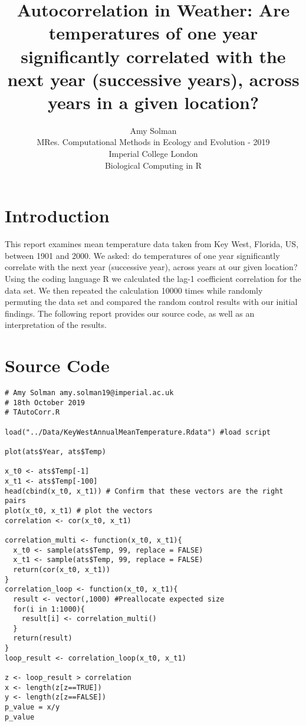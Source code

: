\documentclass[final,3p]{CSP}
\begin{document}
\begin{frontmatter}

\title{Autocorrelation in Weather: Are temperatures of one year significantly correlated with the next year (successive years), across years in a given location?}

\author{Amy Solman \\%
MRes. Computational Methods in Ecology and Evolution - 2019\\
Imperial College London\\
Biological Computing in R}


\end{frontmatter}

\section{Introduction}
\label{}
\noindent
This report examines mean temperature data taken from Key West, Florida, US, between 1901 and 2000. We asked: do temperatures of one year significantly correlate with the next year (successive year), across years at our given location? Using the coding language R we calculated the lag-1 coefficient correlation for the data set. We then repeated the calculation 10000 times while randomly permuting the data set and compared the random control results with our initial findings. The following report provides our source code, as well as an interpretation of the results.

\section{Source Code}
\begin{verbatim}
# Amy Solman amy.solman19@imperial.ac.uk
# 18th October 2019
# TAutoCorr.R

load("../Data/KeyWestAnnualMeanTemperature.Rdata") #load script

plot(ats$Year, ats$Temp) 

x_t0 <- ats$Temp[-1]
x_t1 <- ats$Temp[-100]
head(cbind(x_t0, x_t1)) # Confirm that these vectors are the right pairs
plot(x_t0, x_t1) # plot the vectors
correlation <- cor(x_t0, x_t1)

correlation_multi <- function(x_t0, x_t1){ 
  x_t0 <- sample(ats$Temp, 99, replace = FALSE)
  x_t1 <- sample(ats$Temp, 99, replace = FALSE)
  return(cor(x_t0, x_t1))
}
correlation_loop <- function(x_t0, x_t1){
  result <- vector(,1000) #Preallocate expected size
  for(i in 1:1000){
    result[i] <- correlation_multi()
  }
  return(result)
}
loop_result <- correlation_loop(x_t0, x_t1)

z <- loop_result > correlation 
x <- length(z[z==TRUE])
y <- length(z[z==FALSE])
p_value = x/y
p_value 
\end{verbatim}
\end{document}
